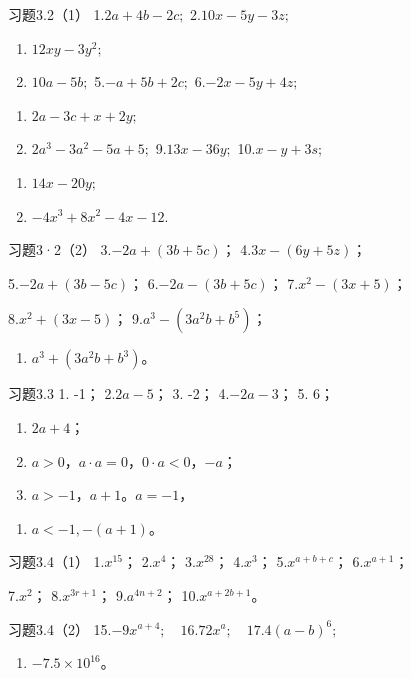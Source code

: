 习题3.2（1） 1.\(2a + 4b - 2c;\) 2.\(10x - 5y - 3z;\)
\begin{enumerate}[start=3]
\item
  \(12xy - 3y^{2};\)
\item
  \(10a - 5b;\) 5.\(-a + 5b + 2c;\) 6.\(-2x - 5y + 4z;\)
\end{enumerate}
\begin{enumerate}[start=7]
\item
  \(2a - 3c + x + 2y;\)
\item
  \(2a^{3} - 3a^{2} - 5a + 5;\) 9.\(13x - 36y;\) 10.\(x - y + 3s;\)
\end{enumerate}
\begin{enumerate}[start=11]
\item
  \(14x - 20y;\)
\item
  \(-4x^{3} + 8x^{2} - 4x - 12.\)
\end{enumerate}

习题3·2（2） 3.\(-2a + (3b + 5c)\)； 4.\(3x - (6y + 5z)\)；

5.\(-2a + (3b - 5c)\)； 6.\(-2a - (3b + 5c)\)； 7.\(x^{2} - (3x + 5)\)；

8.\(x^{2} + (3x - 5)\)； 9.\(a^3 - (3a^2b + b^5)\)；
\begin{enumerate}[start=10]
\item
  \(a^3 + (3a^2b + b^3)\)。
\end{enumerate}

习题3.3 1. -1； 2.\(2a - 5\)； 3. -2； 4.\(-2a - 3\)； 5. 6；

\begin{enumerate}[start=6]
\item
  \(2a + 4\)；
\item
  \(a > 0\)，\(a \cdot a = 0\)，\(0 \cdot a < 0\)，\(-a\)；
\item
  \(a > -1\)，\(a + 1\)。\(a = -1\)，
\end{enumerate}

\begin{enumerate}[start=0]
\item
  \(a < -1, - (a + 1)\)。
\end{enumerate}

习题3.4（1） 1.\(x^{15}\)； 2.\(x^4\)； 3.\(x^{28}\)； 4.\(x^3\)；
5.\(x^{a + b + c}\)； 6.\(x^{a + 1}\)；

7.\(x^{2}\)； 8.\(x^{3r+1}\)； 9.\(a^{4n+2}\)； 10.\(x^{a+2b+1}\)。

习题3.4（2） 15.\(-9x^{a + 4};\quad 16.72x^{a};\quad 17.4(a - b)^{6};\)

\begin{enumerate}[start=18]
\item
  \(-7.5 \times 10^{16}\)。
\end{enumerate}


